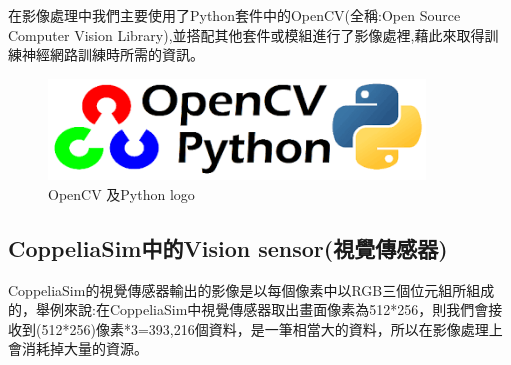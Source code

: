 \documentclass[14pt,a4paper]{report}  %
\begin{document}
 在影像處理中我們主要使用了Python套件中的OpenCV(全稱:Open Source Computer Vision Library),並搭配其他套件或模組進行了影像處裡,藉此來取得訓練神經網路訓練時所需的資訊。\\
\begin{figure}[hbt!]
\center
\includegraphics[width=10cm]{pythonCVlogo}
\caption{\Large OpenCV 及Python logo}
\label{OpenCV 及Python logo}
\end{figure}

\subsection{CoppeliaSim中的Vision sensor(視覺傳感器)}
 CoppeliaSim的視覺傳感器輸出的影像是以每個像素中以RGB三個位元組所組成的，舉例來說:在CoppeliaSim中視覺傳感器取出畫面像素為512*256，則我們會接收到(512*256)像素*3=393,216個資料，是一筆相當大的資料，所以在影像處理上會消耗掉大量的資源。\\
\end{document}
